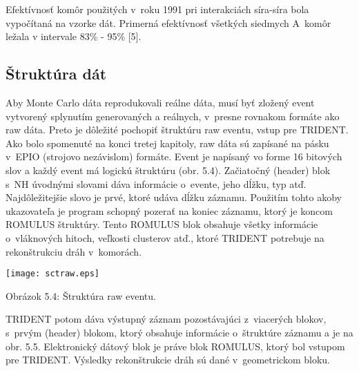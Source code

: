 Efektívnosť komôr použitých v~roku 1991 pri interakciách síra-síra bola
vypočítaná na vzorke dát. Primerná efektívnosť všetkých siedmych A~komôr
ležala v intervale 83\% - 95\% [5].

\subsection{Štruktúra  dát}
Aby Monte Carlo dáta reprodukovali reálne dáta, musí byť zložený event
vytvorený splynutím generovaných a reálnych, v~presne rovnakom formáte ako
raw dáta. Preto je dôležité pochopiť štruktúru raw eventu, vstup pre
TRIDENT. Ako bolo spomenuté na konci tretej kapitoly, raw dáta sú zapísané na
pásku  v~EPIO (strojovo nezávislom) formáte. Event je napísaný vo forme 16
bitových slov a každý event má logickú štruktúru (obr. 5.4).
Začiatočný (header) blok s~NH úvodnými slovami dáva informácie o~evente,
jeho dĺžku, typ atď. Najdôležitejšie slovo je prvé, ktoré udáva dĺžku
záznamu. Použitím tohto akoby ukazovateľa je program schopný pozerať na
koniec záznamu, ktorý je  koncom ROMULUS štruktúry. Tento ROMULUS
blok obsahuje všetky informácie o~vláknových hitoch, veľkosti clusterov atď.,
ktoré TRIDENT potrebuje na rekonštrukciu dráh v~komorách.
\begin{center}
  \texttt{[image: sctraw.eps]}
\end{center}
\begin{center}
  Obrázok 5.4: Štruktúra raw eventu.
\end{center}
TRIDENT potom dáva výstupný záznam pozostávajúci z~viacerých blokov, s~prvým
(header) blokom, ktorý obsahuje informácie o~štruktúre záznamu a je na obr.
5.5.  Elektronický dátový blok je práve blok ROMULUS, ktorý bol
vstupom pre TRIDENT. Výsledky rekonštrukcie dráh sú dané v~geometrickom
bloku.

